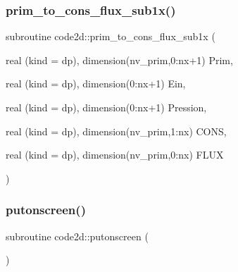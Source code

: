 \mbox{\label{main1DOr2_8f90_a1054c20993438d4f9ef5cc742a3245b4}} 
\subsubsection{\texorpdfstring{prim\+\_\+to\+\_\+cons\+\_\+flux\+\_\+sub1x()}{prim\_to\_cons\_flux\_sub1x()}}
{\footnotesize\ttfamily subroutine code2d\+::prim\+\_\+to\+\_\+cons\+\_\+flux\+\_\+sub1x (\begin{DoxyParamCaption}\item[{real (kind = dp), dimension(nv\+\_\+prim,0\+:nx+1)}]{Prim,  }\item[{real (kind = dp), dimension(0\+:nx+1)}]{Ein,  }\item[{real (kind = dp), dimension(0\+:nx+1)}]{Pression,  }\item[{real (kind = dp), dimension(nv\+\_\+prim,1\+:nx)}]{C\+O\+NS,  }\item[{real (kind = dp), dimension(nv\+\_\+prim,0\+:nx)}]{F\+L\+UX }\end{DoxyParamCaption})}

\mbox{\label{main1DOr2_8f90_a8a5b072c001df1496416cc96562c9916}} 
\subsubsection{\texorpdfstring{putonscreen()}{putonscreen()}}
{\footnotesize\ttfamily subroutine code2d\+::putonscreen (\begin{DoxyParamCaption}{ }\end{DoxyParamCaption})}

\mbox{\label{main1DOr2_8f90_abf018793b221c901580957ed90346b9d}} 
